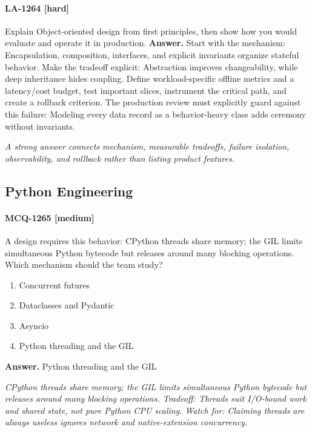 \paragraph{LA-1264 [hard]} Explain Object-oriented design from first principles, then show how you would evaluate and operate it in production.
\noindent\textbf{Answer.} Start with the mechanism: Encapsulation, composition, interfaces, and explicit invariants organize stateful behavior. Make the tradeoff explicit: Abstraction improves changeability, while deep inheritance hides coupling. Define workload-specific offline metrics and a latency/cost budget, test important slices, instrument the critical path, and create a rollback criterion. The production review must explicitly guard against this failure: Modeling every data record as a behavior-heavy class adds ceremony without invariants.
\par\textit{A strong answer connects mechanism, measurable tradeoffs, failure isolation, observability, and rollback rather than listing product features.}
\subsection{Python Engineering}
\paragraph{MCQ-1265 [medium]} A design requires this behavior: CPython threads share memory; the GIL limits simultaneous Python bytecode but releases around many blocking operations. Which mechanism should the team study?
\begin{enumerate}[label=\Alph*.]
\item Concurrent futures
\item Dataclasses and Pydantic
\item Asyncio
\item Python threading and the GIL
\end{enumerate}
\noindent\textbf{Answer.} Python threading and the GIL
\par\textit{CPython threads share memory; the GIL limits simultaneous Python bytecode but releases around many blocking operations. Tradeoff: Threads suit I/O-bound work and shared state, not pure Python CPU scaling. Watch for: Claiming threads are always useless ignores network and native-extension concurrency.}
